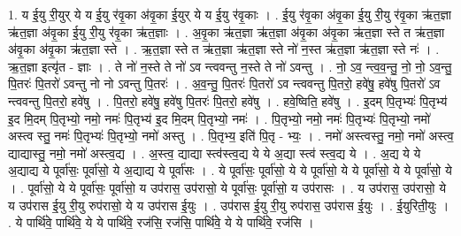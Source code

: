 \documentclass[17pt]{extarticle}
\begin{document}
1. य ई॒यु री॒युर् ये य ई॒यु र॑वृ॒का अ॑वृ॒का ई॒युर् ये य ई॒यु र॑वृ॒काः । . ई॒यु र॑वृ॒का अ॑वृ॒का ई॒यु री॒यु र॑वृ॒का ऋ॑त॒ज्ञा ऋ॑त॒ज्ञा अ॑वृ॒का ई॒यु री॒यु र॑वृ॒का ऋ॑त॒ज्ञाः । . अ॒वृ॒का ऋ॑त॒ज्ञा ऋ॑त॒ज्ञा अ॑वृ॒का अ॑वृ॒का ऋ॑त॒ज्ञा स्ते त ऋ॑त॒ज्ञा अ॑वृ॒का अ॑वृ॒का ऋ॑त॒ज्ञा स्ते । . ऋ॒त॒ज्ञा स्ते त ऋ॑त॒ज्ञा ऋ॑त॒ज्ञा स्ते नो॑ न॒स्त ऋ॑त॒ज्ञा ऋ॑त॒ज्ञा स्ते नः॑ । . ऋ॒त॒ज्ञा इत्यृ॑त - ज्ञाः । . ते नो॑ न॒स्ते ते नो॑ ऽव न्त्ववन्तु न॒स्ते ते नो॑ ऽवन्तु । . नो॒ ऽव॒ न्त्व॒व॒न्तु॒ नो॒ नो॒ ऽव॒न्तु॒ पि॒तरः॑ पि॒तरो॑ ऽवन्तु नो नो ऽवन्तु पि॒तरः॑ । . अ॒व॒न्तु॒ पि॒तरः॑ पि॒तरो॑ ऽव न्त्ववन्तु पि॒तरो॒ हवे॑षु॒ हवे॑षु पि॒तरो॑ ऽव न्त्ववन्तु पि॒तरो॒ हवे॑षु । . पि॒तरो॒ हवे॑षु॒ हवे॑षु पि॒तरः॑ पि॒तरो॒ हवे॑षु । . हवे॒ष्विति॒ हवे॑षु । . इ॒दम् पि॒तृभ्यः॑ पि॒तृभ्य॑ इ॒द मि॒दम् पि॒तृभ्यो॒ नमो॒ नमः॑ पि॒तृभ्य॑ इ॒द मि॒दम् पि॒तृभ्यो॒ नमः॑ । . पि॒तृभ्यो॒ नमो॒ नमः॑ पि॒तृभ्यः॑ पि॒तृभ्यो॒ नमो॑ अस्त्व स्तु॒ नमः॑ पि॒तृभ्यः॑ पि॒तृभ्यो॒ नमो॑ अस्तु । . पि॒तृभ्य॒ इति॑ पि॒तृ - भ्यः॒ । . नमो॑ अस्त्वस्तु॒ नमो॒ नमो॑ अस्त्व॒ द्याद्यास्तु॒ नमो॒ नमो॑ अस्त्व॒द्य । . अ॒स्त्व॒ द्याद्या स्त्व॑स्त्व॒द्य ये ये अ॒द्या स्त्व॑ स्त्व॒द्य ये । . अ॒द्य ये ये अ॒द्याद्य ये पूर्वा॑सः॒ पूर्वा॑सो॒ ये अ॒द्याद्य ये पूर्वा॑सः । . ये पूर्वा॑सः॒ पूर्वा॑सो॒ ये ये पूर्वा॑सो॒ ये ये पूर्वा॑सो॒ ये ये पूर्वा॑सो॒ ये । . पूर्वा॑सो॒ ये ये पूर्वा॑सः॒ पूर्वा॑सो॒ य उप॑रास॒ उप॑रासो॒ ये पूर्वा॑सः॒ पूर्वा॑सो॒ य उप॑रासः । . य उप॑रास॒ उप॑रासो॒ ये य उप॑रास ई॒यु री॒यु रुप॑रासो॒ ये य उप॑रास ई॒युः । . उप॑रास ई॒यु री॒यु रुप॑रास॒ उप॑रास ई॒युः । . ई॒युरिती॒युः । . ये पार्थि॑वे॒ पार्थि॑वे॒ ये ये पार्थि॑वे॒ रज॑सि॒ रज॑सि॒ पार्थि॑वे॒ ये ये पार्थि॑वे॒ रज॑सि । \newline
\end{document}
